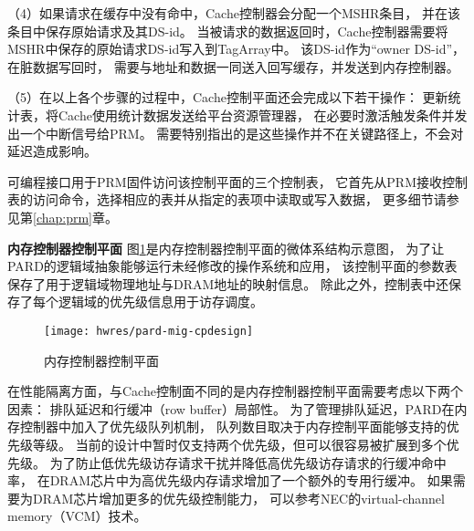 （4）如果请求在缓存中没有命中，Cache控制器会分配一个MSHR条目，
并在该条目中保存原始请求及其DS-id。
当被请求的数据返回时，Cache控制器需要将MSHR中保存的原始请求DS-id写入到TagArray中。
该DS-id作为``owner DS-id''，在脏数据写回时，
需要与地址和数据一同送入回写缓存，并发送到内存控制器。

（5）在以上各个步骤的过程中，Cache控制平面还会完成以下若干操作：
更新统计表，将Cache使用统计数据发送给平台资源管理器，
在必要时激活触发条件并发出一个中断信号给PRM。
需要特别指出的是这些操作并不在关键路径上，不会对延迟造成影响。

可编程接口用于PRM固件访问该控制平面的三个控制表，
它首先从PRM接收控制表的访问命令，选择相应的表并从指定的表项中读取或写入数据，
更多细节请参见第\ref{chap:prm}章。


\textbf{内存控制器控制平面}\quad
图\ref{fig:pard-mig-cpdesign}是内存控制器控制平面的微体系结构示意图，
为了让PARD的逻辑域抽象能够运行未经修改的操作系统和应用，
该控制平面的参数表保存了用于逻辑域物理地址与DRAM地址的映射信息。
除此之外，控制表中还保存了每个逻辑域的优先级信息用于访存调度。

\begin{figure}[tb]
  \centering
  \texttt{[image: hwres/pard-mig-cpdesign]}
  \caption{内存控制器控制平面}
  \label{fig:pard-mig-cpdesign}
\end{figure}


在性能隔离方面，与Cache控制面不同的是内存控制器控制平面需要考虑以下两个因素：
排队延迟和行缓冲（row buffer）局部性。
为了管理排队延迟，PARD在内存控制器中加入了优先级队列机制，
队列数目取决于内存控制平面能够支持的优先级等级。
当前的设计中暂时仅支持两个优先级，但可以很容易被扩展到多个优先级。
为了防止低优先级访存请求干扰并降低高优先级访存请求的行缓冲命中率，
在DRAM芯片中为高优先级内存请求增加了一个额外的专用行缓冲。
如果需要为DRAM芯片增加更多的优先级控制能力，
可以参考NEC的virtual-channel memory（VCM）\cite{nec-vcm}技术。

